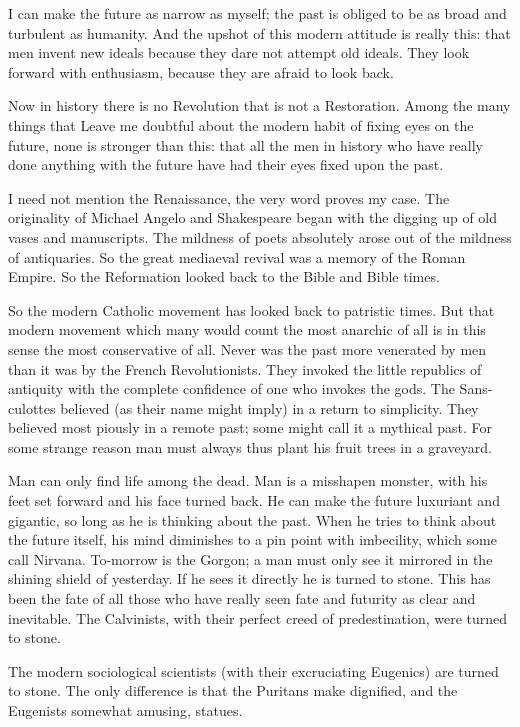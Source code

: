 \documentclass[final,10pt,letterpaper,twocolumn,openany]{book}
\begin{document}
 I can make the future as
narrow as myself; the past is obliged to be as broad and turbulent as
humanity. And the upshot of this modern attitude is really this: that men
invent new ideals because they dare not attempt old ideals. They look
forward with enthusiasm, because they are afraid to look back.

Now in history there is no Revolution that is not a Restoration. Among
the many things that Leave me doubtful about the modern habit of fixing
eyes on the future, none is stronger than this: that all the men in history
who have really done anything with the future have had their eyes fixed
upon the past. 

I need not mention the Renaissance, the very word proves
my case. The originality of Michael Angelo and Shakespeare began with
the digging up of old vases and manuscripts. The mildness of poets
absolutely arose out of the mildness of antiquaries. So the great mediaeval
revival was a memory of the Roman Empire. So the Reformation looked
back to the Bible and Bible times. 

So the modern Catholic movement has
looked back to patristic times. But that modern movement which many
would count the most anarchic of all is in this sense the most conservative
of all. Never was the past more venerated by men than it was by the
French Revolutionists. They invoked the little republics of antiquity with
the complete confidence of one who invokes the gods. The Sans-culottes
believed (as their name might imply) in a return to simplicity. They
believed most piously in a remote past; some might call it a mythical past.
For some strange reason man must always thus plant his fruit trees in a
graveyard. 

Man can only find life among the dead. Man is a misshapen
monster, with his feet set forward and his face turned back. He can make
the future luxuriant and gigantic, so long as he is thinking about the past.
When he tries to think about the future itself, his mind diminishes to a pin
point with imbecility, which some call Nirvana. To-morrow is the Gorgon;
a man must only see it mirrored in the shining shield of yesterday. If he
sees it directly he is turned to stone. This has been the fate of all those who
have really seen fate and futurity as clear and inevitable. The Calvinists,
with their perfect creed of predestination, were turned to stone. 

The
modern sociological scientists (with their excruciating Eugenics) are
turned to stone. The only difference is that the Puritans make dignified,
and the Eugenists somewhat amusing, statues.
\end{document}
